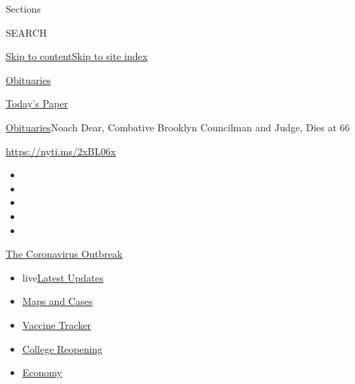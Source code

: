 Sections

SEARCH

\protect\hyperlink{site-content}{Skip to
content}\protect\hyperlink{site-index}{Skip to site index}

\href{https://www.nytimes3xbfgragh.onion/section/obituaries}{Obituaries}

\href{https://myaccount.nytimes3xbfgragh.onion/auth/login?response_type=cookie\&client_id=vi}{}

\href{https://www.nytimes3xbfgragh.onion/section/todayspaper}{Today's
Paper}

\href{/section/obituaries}{Obituaries}\textbar{}Noach Dear, Combative
Brooklyn Councilman and Judge, Dies at 66

\url{https://nyti.ms/2xBL06x}

\begin{itemize}
\item
\item
\item
\item
\item
\end{itemize}

\href{https://www.nytimes3xbfgragh.onion/news-event/coronavirus?action=click\&pgtype=Article\&state=default\&region=TOP_BANNER\&context=storylines_menu}{The
Coronavirus Outbreak}

\begin{itemize}
\tightlist
\item
  live\href{https://www.nytimes3xbfgragh.onion/2020/08/04/world/coronavirus-covid-19.html?action=click\&pgtype=Article\&state=default\&region=TOP_BANNER\&context=storylines_menu}{Latest
  Updates}
\item
  \href{https://www.nytimes3xbfgragh.onion/interactive/2020/us/coronavirus-us-cases.html?action=click\&pgtype=Article\&state=default\&region=TOP_BANNER\&context=storylines_menu}{Maps
  and Cases}
\item
  \href{https://www.nytimes3xbfgragh.onion/interactive/2020/science/coronavirus-vaccine-tracker.html?action=click\&pgtype=Article\&state=default\&region=TOP_BANNER\&context=storylines_menu}{Vaccine
  Tracker}
\item
  \href{https://www.nytimes3xbfgragh.onion/2020/08/02/us/covid-college-reopening.html?action=click\&pgtype=Article\&state=default\&region=TOP_BANNER\&context=storylines_menu}{College
  Reopening}
\item
  \href{https://www.nytimes3xbfgragh.onion/live/2020/08/03/business/stock-market-today-coronavirus?action=click\&pgtype=Article\&state=default\&region=TOP_BANNER\&context=storylines_menu}{Economy}
\end{itemize}

